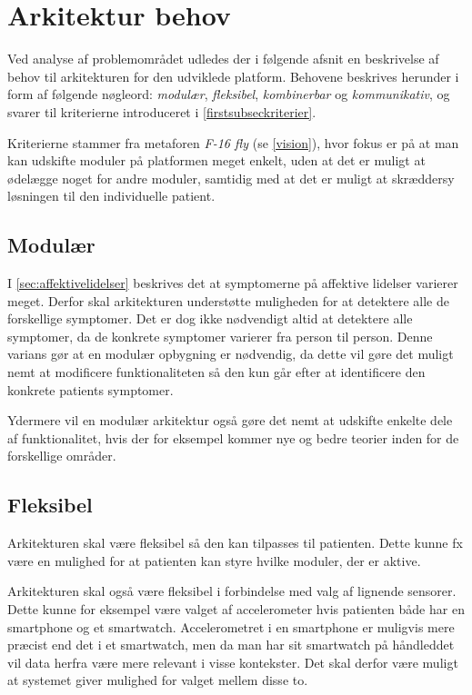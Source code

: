 \section{Arkitektur behov}\label{arkitekturkrav}
Ved analyse af problemområdet udledes der i følgende afsnit en beskrivelse af behov til arkitekturen for den udviklede platform.
Behovene beskrives herunder i form af følgende nøgleord: \textit{modulær}, \textit{fleksibel}, \textit{kombinerbar} og \textit{kommunikativ}, og svarer til kriterierne introduceret i \cref{firstsubseckriterier}.

Kriterierne stammer fra metaforen \textit{F-16 fly} (se \cref{vision}), hvor fokus er på at man kan udskifte moduler på platformen meget enkelt, uden at det er muligt at ødelægge noget for andre moduler, samtidig med at det er muligt at skræddersy løsningen til den individuelle patient.


\subsection{Modulær}\label{arkitekturkrav::modulaer}
I \cref{sec:affektivelidelser} beskrives det at symptomerne på affektive lidelser varierer meget.
Derfor skal arkitekturen understøtte muligheden for at detektere alle de forskellige symptomer.
Det er dog ikke nødvendigt altid at detektere alle symptomer, da de konkrete symptomer varierer fra person til person.
Denne varians gør at en modulær opbygning er nødvendig, da dette vil gøre det muligt nemt at modificere funktionaliteten så den kun går efter at identificere den konkrete patients symptomer.

Ydermere vil en modulær arkitektur også gøre det nemt at udskifte enkelte dele af funktionalitet, hvis der for eksempel kommer nye og bedre teorier inden for de forskellige områder.

\subsection{Fleksibel}\label{arkitekturkrav::fleksibel}
Arkitekturen skal være fleksibel så den kan tilpasses til patienten.
Dette kunne fx være en mulighed for at patienten kan styre hvilke moduler, der er aktive.

Arkitekturen skal også være fleksibel i forbindelse med valg af lignende sensorer.
Dette kunne for eksempel være valget af accelerometer hvis patienten både har en smartphone og et smartwatch.
Accelerometret i en smartphone er muligvis mere præcist end det i et smartwatch, men da man har sit smartwatch på håndleddet vil data herfra være mere relevant i visse kontekster.
Det skal derfor være muligt at systemet giver mulighed for valget mellem disse to.

